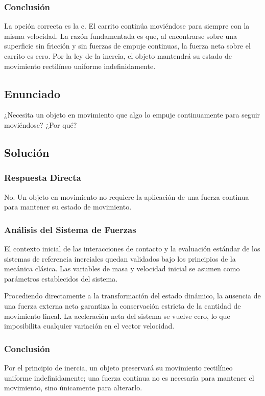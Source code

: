 \documentclass[12pt, a4paper]{article}
\begin{document}
\subsubsection*{Conclusión}
La opción correcta es la c. El carrito continúa moviéndose para siempre con la misma velocidad. La razón fundamentada es que, al encontrarse sobre una superficie sin fricción y sin fuerzas de empuje continuas, la fuerza neta sobre el carrito es cero. Por la ley de la inercia, el objeto mantendrá su estado de movimiento rectilíneo uniforme indefinidamente.

\newpage

\subsection*{Enunciado}
¿Necesita un objeto en movimiento que algo lo empuje continuamente para seguir moviéndose? ¿Por qué?

\subsection*{Solución}

\subsubsection*{Respuesta Directa}
No. Un objeto en movimiento no requiere la aplicación de una fuerza continua para mantener su estado de movimiento.

\subsubsection*{Análisis del Sistema de Fuerzas}
El contexto inicial de las interacciones de contacto y la evaluación estándar de los sistemas de referencia inerciales quedan validados bajo los principios de la mecánica clásica. Las variables de masa y velocidad inicial se asumen como parámetros establecidos del sistema.

Procediendo directamente a la transformación del estado dinámico, la ausencia de una fuerza externa neta garantiza la conservación estricta de la cantidad de movimiento lineal. La aceleración neta del sistema se vuelve cero, lo que imposibilita cualquier variación en el vector velocidad.

\subsubsection*{Conclusión}
Por el principio de inercia, un objeto preservará su movimiento rectilíneo uniforme indefinidamente; una fuerza continua no es necesaria para mantener el movimiento, sino únicamente para alterarlo.
\end{document}
